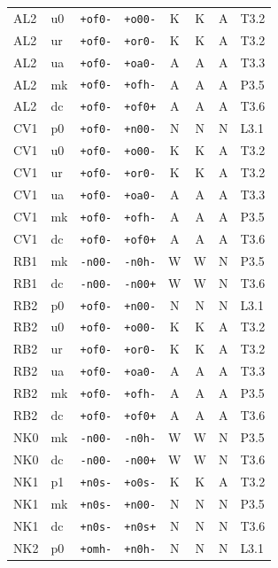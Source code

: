 {\begin{longtable}{@{}llllcccl@{}}
AL2 & u0 & \texttt{+of0-} & \texttt{+o00-} & K & K & A & T3.2 \\
AL2 & ur & \texttt{+of0-} & \texttt{+or0-} & K & K & A & T3.2 \\
AL2 & ua & \texttt{+of0-} & \texttt{+oa0-} & A & A & A & T3.3 \\
AL2 & mk & \texttt{+of0-} & \texttt{+ofh-} & A & A & A & P3.5 \\
AL2 & dc & \texttt{+of0-} & \texttt{+of0+} & A & A & A & T3.6 \\
CV1 & p0 & \texttt{+of0-} & \texttt{+n00-} & N & N & N & L3.1 \\
CV1 & u0 & \texttt{+of0-} & \texttt{+o00-} & K & K & A & T3.2 \\
CV1 & ur & \texttt{+of0-} & \texttt{+or0-} & K & K & A & T3.2 \\
CV1 & ua & \texttt{+of0-} & \texttt{+oa0-} & A & A & A & T3.3 \\
CV1 & mk & \texttt{+of0-} & \texttt{+ofh-} & A & A & A & P3.5 \\
CV1 & dc & \texttt{+of0-} & \texttt{+of0+} & A & A & A & T3.6 \\
RB1 & mk & \texttt{-n00-} & \texttt{-n0h-} & W & W & N & P3.5 \\
RB1 & dc & \texttt{-n00-} & \texttt{-n00+} & W & W & N & T3.6 \\
RB2 & p0 & \texttt{+of0-} & \texttt{+n00-} & N & N & N & L3.1 \\
RB2 & u0 & \texttt{+of0-} & \texttt{+o00-} & K & K & A & T3.2 \\
RB2 & ur & \texttt{+of0-} & \texttt{+or0-} & K & K & A & T3.2 \\
RB2 & ua & \texttt{+of0-} & \texttt{+oa0-} & A & A & A & T3.3 \\
RB2 & mk & \texttt{+of0-} & \texttt{+ofh-} & A & A & A & P3.5 \\
RB2 & dc & \texttt{+of0-} & \texttt{+of0+} & A & A & A & T3.6 \\
NK0 & mk & \texttt{-n00-} & \texttt{-n0h-} & W & W & N & P3.5 \\
NK0 & dc & \texttt{-n00-} & \texttt{-n00+} & W & W & N & T3.6 \\
NK1 & p1 & \texttt{+n0s-} & \texttt{+o0s-} & K & K & A & T3.2 \\
NK1 & mk & \texttt{+n0s-} & \texttt{+n00-} & N & N & N & P3.5 \\
NK1 & dc & \texttt{+n0s-} & \texttt{+n0s+} & N & N & N & T3.6 \\
NK2 & p0 & \texttt{+omh-} & \texttt{+n0h-} & N & N & N & L3.1 \\

\end{longtable}}
